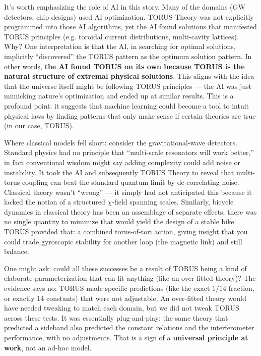 \documentclass[12pt]{article}
\begin{document}
It’s worth emphasizing the role of AI in this story. Many of the domains (GW detectors, chip designs) used AI optimization. TORUS Theory was not explicitly programmed into those AI algorithms, yet the AI found solutions that manifested TORUS principles (e.g. toroidal current distributions, multi-cavity lattices). Why? One interpretation is that the AI, in searching for optimal solutions, implicitly “discovered” the TORUS pattern as the optimum solution pattern. In other words, \textbf{the AI found TORUS on its own because TORUS is the natural structure of extremal physical solutions}. This aligns with the idea that the universe itself might be following TORUS principles — the AI was just mimicking nature’s optimization and ended up at similar results. This is a profound point: it suggests that machine learning could become a tool to intuit physical laws by finding patterns that only make sense if certain theories are true (in our case, TORUS). 

Where classical models fell short: consider the gravitational-wave detectors. Standard physics had no principle that “multi-scale resonators will work better,” in fact conventional wisdom might say adding complexity could add noise or instability. It took the AI and subsequently TORUS Theory to reveal that multi-torus coupling can beat the standard quantum limit by de-correlating noise. Classical theory wasn’t “wrong” — it simply had not anticipated this because it lacked the notion of a structured $\chi$-field spanning scales. Similarly, bicycle dynamics in classical theory has been an assemblage of separate effects; there was no single quantity to minimize that would yield the design of a stable bike. TORUS provided that: a combined torus-of-tori action, giving insight that you could trade gyroscopic stability for another loop (the magnetic link) and still balance. 

One might ask: could all these successes be a result of TORUS being a kind of elaborate parameterization that can fit anything (like an over-fitted theory)? The evidence says no; TORUS made specific predictions (like the exact $1/14$ fraction, or exactly 14 constants) that were not adjustable. An over-fitted theory would have needed tweaking to match each domain, but we did not tweak TORUS across these tests. It was essentially plug-and-play: the same theory that predicted a sideband also predicted the constant relations and the interferometer performance, with no adjustments. That is a sign of a \textbf{universal principle at work}, not an ad-hoc model.
\end{document}

